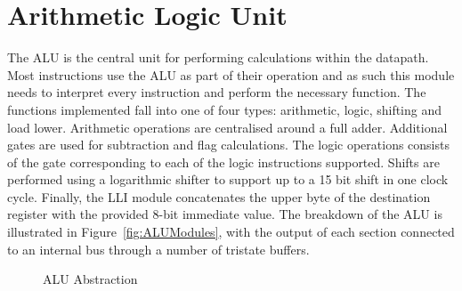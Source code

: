 

\section{Arithmetic Logic Unit}\label{sect:design:alu}

The ALU is the central unit for performing calculations within the datapath. 
Most instructions use the ALU as part of their operation and as such this module needs to interpret every instruction and perform the necessary function. 
The functions implemented fall into one of four types: arithmetic, logic, shifting and load lower. 
Arithmetic operations are centralised around a full adder.
Additional gates are used for subtraction and flag calculations. %
The logic operations consists of the gate corresponding to each of the logic instructions supported. 
Shifts are performed using a logarithmic shifter to support up to a 15 bit shift in one clock cycle. 
Finally, the LLI module concatenates the upper byte of the destination register with the provided 8-bit immediate value. 
The breakdown of the ALU is illustrated in Figure~\ref{fig:ALUModules}, with the output of each section connected to an internal bus through a number of tristate buffers. 

\begin{figure}[h]
	\centering
	\caption{ALU Abstraction}
	\label{fig:ALUAbsract}
\end{figure}

